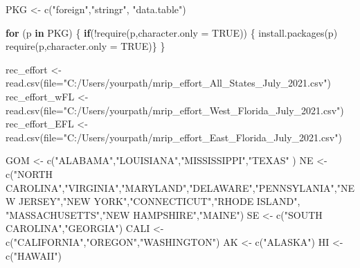 \documentclass[
]{book}
\newenvironment{Shaded}{\begin{snugshade}}{\end{snugshade}}
\newcommand{\AttributeTok}[1]{\textcolor[rgb]{0.77,0.63,0.00}{#1}}
\newcommand{\ConstantTok}[1]{\textcolor[rgb]{0.00,0.00,0.00}{#1}}
\newcommand{\ControlFlowTok}[1]{\textcolor[rgb]{0.13,0.29,0.53}{\textbf{#1}}}
\newcommand{\FunctionTok}[1]{\textcolor[rgb]{0.00,0.00,0.00}{#1}}
\newcommand{\NormalTok}[1]{#1}
\newcommand{\OtherTok}[1]{\textcolor[rgb]{0.56,0.35,0.01}{#1}}
\newcommand{\SpecialCharTok}[1]{\textcolor[rgb]{0.00,0.00,0.00}{#1}}
\newcommand{\StringTok}[1]{\textcolor[rgb]{0.31,0.60,0.02}{#1}}
\begin{document}
\begin{Shaded}
\begin{Highlighting}[]
\NormalTok{PKG }\OtherTok{\textless{}{-}} \FunctionTok{c}\NormalTok{(}\StringTok{"foreign"}\NormalTok{,}\StringTok{"stringr"}\NormalTok{, }\StringTok{"data.table"}\NormalTok{)}

\ControlFlowTok{for}\NormalTok{ (p }\ControlFlowTok{in}\NormalTok{ PKG) \{}
  \ControlFlowTok{if}\NormalTok{(}\SpecialCharTok{!}\FunctionTok{require}\NormalTok{(p,}\AttributeTok{character.only =} \ConstantTok{TRUE}\NormalTok{)) \{}
    \FunctionTok{install.packages}\NormalTok{(p)}
    \FunctionTok{require}\NormalTok{(p,}\AttributeTok{character.only =} \ConstantTok{TRUE}\NormalTok{)\}}
\NormalTok{\}}

\NormalTok{rec\_effort }\OtherTok{\textless{}{-}} \FunctionTok{read.csv}\NormalTok{(}\AttributeTok{file=}\StringTok{"C:/Users/yourpath/mrip\_effort\_All\_States\_July\_2021.csv"}\NormalTok{)}
\NormalTok{rec\_effort\_wFL }\OtherTok{\textless{}{-}} \FunctionTok{read.csv}\NormalTok{(}\AttributeTok{file=}\StringTok{"C:/Users/yourpath/mrip\_effort\_West\_Florida\_July\_2021.csv"}\NormalTok{)}
\NormalTok{rec\_effort\_EFL }\OtherTok{\textless{}{-}}\FunctionTok{read.csv}\NormalTok{(}\AttributeTok{file=}\StringTok{"C:/Users/yourpath/mrip\_effort\_East\_Florida\_July\_2021.csv"}\NormalTok{)}

\NormalTok{GOM }\OtherTok{\textless{}{-}} \FunctionTok{c}\NormalTok{(}\StringTok{"ALABAMA"}\NormalTok{,}\StringTok{"LOUISIANA"}\NormalTok{,}\StringTok{"MISSISSIPPI"}\NormalTok{,}\StringTok{"TEXAS"}\NormalTok{ )}
\NormalTok{NE }\OtherTok{\textless{}{-}} \FunctionTok{c}\NormalTok{(}\StringTok{"NORTH CAROLINA"}\NormalTok{,}\StringTok{"VIRGINIA"}\NormalTok{,}\StringTok{"MARYLAND"}\NormalTok{,}\StringTok{"DELAWARE"}\NormalTok{,}\StringTok{"PENNSYLANIA"}\NormalTok{,}\StringTok{"NEW JERSEY"}\NormalTok{,}\StringTok{"NEW YORK"}\NormalTok{,}\StringTok{"CONNECTICUT"}\NormalTok{,}\StringTok{"RHODE ISLAND"}\NormalTok{,}
        \StringTok{"MASSACHUSETTS"}\NormalTok{,}\StringTok{"NEW HAMPSHIRE"}\NormalTok{,}\StringTok{"MAINE"}\NormalTok{)}
\NormalTok{SE }\OtherTok{\textless{}{-}} \FunctionTok{c}\NormalTok{(}\StringTok{"SOUTH CAROLINA"}\NormalTok{,}\StringTok{"GEORGIA"}\NormalTok{)}
\NormalTok{CALI }\OtherTok{\textless{}{-}} \FunctionTok{c}\NormalTok{(}\StringTok{"CALIFORNIA"}\NormalTok{,}\StringTok{"OREGON"}\NormalTok{,}\StringTok{"WASHINGTON"}\NormalTok{)}
\NormalTok{AK }\OtherTok{\textless{}{-}} \FunctionTok{c}\NormalTok{(}\StringTok{"ALASKA"}\NormalTok{)}
\NormalTok{HI }\OtherTok{\textless{}{-}} \FunctionTok{c}\NormalTok{(}\StringTok{"HAWAII"}\NormalTok{)}


\end{Highlighting}
\end{Shaded}
\end{document}
